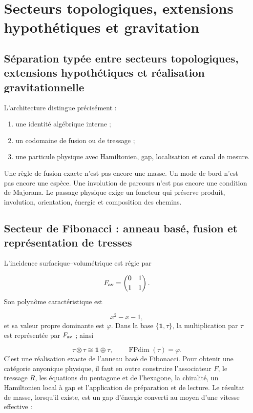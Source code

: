 \section{Secteurs topologiques, extensions hypothétiques et gravitation}
\subsection{Séparation typée entre secteurs topologiques, extensions hypothétiques et réalisation gravitationnelle}
L'architecture distingue précisément :

\begin{enumerate}
\item une identité algébrique interne ;
\item un codomaine de fusion ou de tressage ;
\item une particule physique avec Hamiltonien, gap, localisation et canal de
mesure.

\end{enumerate}
Une règle de fusion exacte n'est pas encore une masse. Un mode de bord n'est pas encore une espèce. Une involution de parcours n'est pas encore une condition de Majorana. Le passage physique exige un foncteur qui préserve produit, involution, orientation, énergie et composition des chemins.

\subsection{Secteur de Fibonacci : anneau basé, fusion et représentation de tresses}
L'incidence surfacique--volumétrique est régie par

\[
F_{\rm av}=
\begin{pmatrix}
0&1\\[2pt]1&1
\end{pmatrix}.
\]
Son polynôme caractéristique est

\[
x^2-x-1,
\]
et sa valeur propre dominante est \(\varphi\). Dans la base \(\{\mathbf1,\tau\}\), la multiplication par \(\tau\) est représentée par \(F_{\rm av}\) ; ainsi

\[
\tau\otimes\tau\cong\mathbf1\oplus\tau,
\qquad
\operatorname{FPdim}(\tau)=\varphi.
\]
C'est une réalisation exacte de l'anneau basé de Fibonacci. Pour obtenir une catégorie anyonique physique, il faut en outre construire l'associateur \(F\), le tressage \(R\), les équations du pentagone et de l'hexagone, la chiralité, un Hamiltonien local à gap et l'application de préparation et de lecture. Le résultat de masse, lorsqu'il existe, est un gap d'énergie converti au moyen d'une vitesse effective :

